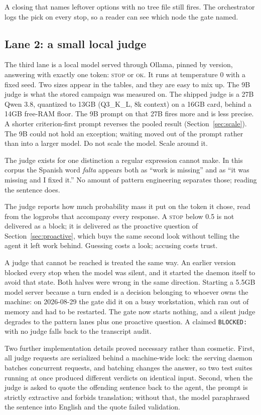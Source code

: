 A closing that names leftover options with no tree file still fires.
The orchestrator logs the pick on every stop, so a reader can see
which node the gate named.

\subsection{Lane 2: a small local judge}

The third lane is a local model served through Ollama, pinned by version,
answering with exactly one token: \textsc{stop} or \textsc{ok}. It runs at
temperature 0 with a fixed seed. Two sizes appear in the tables, and they
are easy to mix up. The 9B judge is what the stored campaign was measured
on. The shipped judge is a 27B Qwen 3.8, quantized to 13GB (Q3\_K\_L, 8k
context) on a 16GB card, behind a 14GB free-RAM floor. The 9B prompt on
that 27B fires more and is less precise. A shorter criterion-first prompt
reverses the pooled result (Section~\ref{sec:scale}). The 9B could not
hold an exception; waiting moved out of the prompt rather than into a
larger model. Do not scale the model. Scale around it.

The judge exists for one distinction a regular expression cannot make. In this
corpus the Spanish word \emph{falta} appears both as ``work is missing'' and as
``it was missing and I fixed it.'' No amount of pattern engineering separates
those; reading the sentence does.

The judge reports how much probability mass it put on the token it chose, read
from the logprobs that accompany every response. A \textsc{stop} below 0.5
is not delivered as a block; it is delivered as the proactive question of
Section~\ref{sec:proactive}, which buys the same second look without telling the
agent it left work behind. Guessing costs a look; accusing costs trust.

A judge that cannot be reached is treated the same way. An earlier version
blocked every stop when the model was silent, and it started the daemon itself
to avoid that state. Both halves were wrong in the same direction. Starting a
5.5GB model server because a turn ended is a decision belonging to whoever owns
the machine: on 2026-08-29 the gate did it on a busy workstation, which ran out
of memory and had to be restarted. The gate now starts nothing, and a silent
judge degrades to the pattern lanes plus one proactive question. A claimed
\texttt{BLOCKED:} with no judge falls back to the transcript audit.

Two further implementation details proved necessary rather than cosmetic. First, all
judge requests are serialized behind a machine-wide lock: the serving daemon
batches concurrent requests, and batching changes the answer, so two test suites
running at once produced different verdicts on identical input. Second, when the
judge is asked to quote the offending sentence back to the agent, the prompt is
strictly extractive and forbids translation; without that, the model paraphrased
the sentence into English and the quote failed validation.

